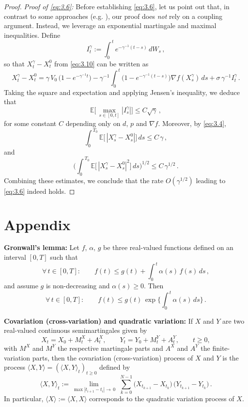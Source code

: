 \documentclass[12pt]{article}
\numberwithin{equation}{section}
\theoremstyle{remark}
\begin{document}
\begin{proof}
\medskip\noindent \textit{Proof of \eqref{eq:3.6}:} Before establishing \eqref{eq:3.6}, let us point out that, in contrast to some approaches (e.g. \cite{Freidlin2004}), our proof does \emph{not} rely on a coupling argument. Instead, we leverage an exponential martingale and maximal inequalities. Define 
\[ 
I_t^\gamma := \int_{0}^{\,t} e^{-\gamma^{-1}(t-s)}\,dW_s\,,
\] 
so that $X_t^\gamma - X_t^0$ from \eqref{eq:3.10} can be written as 
\[ 
X_t^\gamma - X_t^0 = \gamma\,V_0\,\big(1 - e^{-\gamma^{-1}t}\big) - \gamma^{-1}\int_{0}^{\,t} \Big(1 - e^{-\gamma^{-1}(t-s)}\Big)\nabla f(X_s^\gamma)\,ds + \sigma\,\gamma^{-1} I_t^\gamma\,.
\] 
Taking the square and expectation and applying Jensen’s inequality, we deduce that 
\[ 
\mathbb{E}\!\Big[\,\max_{s\in[0,t]} |I_s^\gamma|\Big] \le C\sqrt{\gamma}\,,
\] 
for some constant $C$ depending only on $d$, $p$ and $\nabla f$. Moreover, by \eqref{eq:3.4}, 
\[ 
\int_{0}^{\,T_0} \mathbb{E}\!\big[\,|X_s^\gamma - X_s^0|\big]\,ds \le C\,\gamma\,,
\] 
and 
\[ 
\Bigg(\int_{0}^{\,T_0} \mathbb{E}\!\big[\,|X_s^\gamma - X_s^0|^2\big]\,ds\Bigg)^{\!1/2} \le C\,\gamma^{1/2}\,. 
\] 
Combining these estimates, we conclude that the rate $O(\gamma^{1/2})$ leading to \eqref{eq:3.6} indeed holds. 
\end{proof}

\section{Appendix}

\noindent \textbf{Gronwall’s lemma:} Let $f$, $\alpha$, $g$ be three real-valued functions defined on an interval $[0,T]$ such that 
\[ 
\forall\,t \in [0,T]: \qquad f(t) \le g(t) + \int_{0}^{\,t} \alpha(s)\,f(s)\,ds\,,
\] 
and assume $g$ is non-decreasing and $\alpha(s) \ge 0$. Then 
\[ 
\forall\,t \in [0,T]: \qquad f(t) \le g(t)\,\exp\!\Big\{\int_{0}^{\,t} \alpha(s)\,ds\Big\}\,. 
\]

\noindent \textbf{Covariation (cross-variation) and quadratic variation:} If $X$ and $Y$ are two real-valued continuous semimartingales given by 
\[ 
X_t = X_0 + M^X_t + A^X_t, \qquad Y_t = Y_0 + M^Y_t + A^Y_t, \qquad t \ge 0, 
\] 
with $M^X$ and $M^Y$ the respective martingale parts and $A^X$ and $A^Y$ the finite-variation parts, then the covariation (cross-variation) process of $X$ and $Y$ is the process $\langle X, Y \rangle = (\langle X,Y\rangle_t)_{t\ge0}$ defined by 
\[ 
\langle X, Y \rangle_t := \lim_{\max |t_{i+1}-t_i|\to\,0}\;\sum_{k=0}^{N-1} \big(X_{t_{k+1}} - X_{t_k}\big)\,\big(Y_{t_{k+1}} - Y_{t_k}\big)\,. 
\] 
In particular, $\langle X \rangle := \langle X, X\rangle$ corresponds to the quadratic variation process of $X$.
\end{document}
